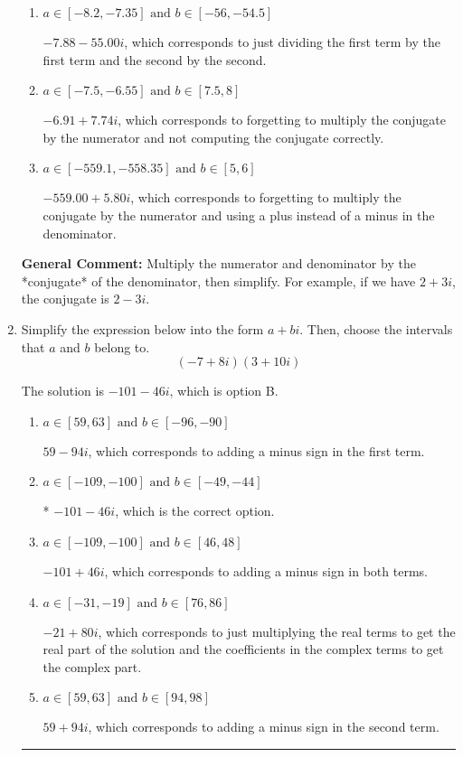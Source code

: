 \documentclass{extbook}[14pt]
\newcommand{\litem}[1]{\item #1

\rule{\textwidth}{0.4pt}}
\begin{document}
\begin{enumerate}
{\begin{enumerate}[label=\Alph*.]
* $-8.60  + 5.80 i$, which is the correct option.
\item \( a \in [-8.2, -7.35] \text{ and } b \in [-56, -54.5] \)

 $-7.88  - 55.00 i$, which corresponds to just dividing the first term by the first term and the second by the second.
\item \( a \in [-7.5, -6.55] \text{ and } b \in [7.5, 8] \)

 $-6.91  + 7.74 i$, which corresponds to forgetting to multiply the conjugate by the numerator and not computing the conjugate correctly.
\item \( a \in [-559.1, -558.35] \text{ and } b \in [5, 6] \)

 $-559.00  + 5.80 i$, which corresponds to forgetting to multiply the conjugate by the numerator and using a plus instead of a minus in the denominator.
\end{enumerate}

\textbf{General Comment:} Multiply the numerator and denominator by the *conjugate* of the denominator, then simplify. For example, if we have $2+3i$, the conjugate is $2-3i$.
}
\litem{
Simplify the expression below into the form $a+bi$. Then, choose the intervals that $a$ and $b$ belong to.
\[ (-7 + 8 i)(3 + 10 i) \]

The solution is \( -101 - 46 i \), which is option B.\begin{enumerate}[label=\Alph*.]
\item \( a \in [59, 63] \text{ and } b \in [-96, -90] \)

 $59 - 94 i$, which corresponds to adding a minus sign in the first term.
\item \( a \in [-109, -100] \text{ and } b \in [-49, -44] \)

* $-101 - 46 i$, which is the correct option.
\item \( a \in [-109, -100] \text{ and } b \in [46, 48] \)

 $-101 + 46 i$, which corresponds to adding a minus sign in both terms.
\item \( a \in [-31, -19] \text{ and } b \in [76, 86] \)

 $-21 + 80 i$, which corresponds to just multiplying the real terms to get the real part of the solution and the coefficients in the complex terms to get the complex part.
\item \( a \in [59, 63] \text{ and } b \in [94, 98] \)

 $59 + 94 i$, which corresponds to adding a minus sign in the second term.
\end{enumerate}

}
\end{enumerate}
\end{document}
